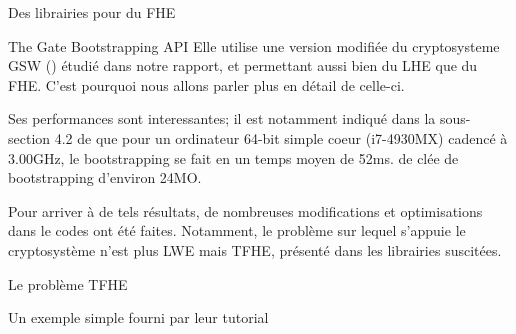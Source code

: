 \begin{section}{Des librairies pour du FHE}
\begin{subsection}{The Gate Bootstrapping API}
Elle utilise une version modifiée du cryptosysteme GSW (\cite{C:GenSahWat13})
étudié dans notre rapport, et permettant aussi bien du LHE que du FHE. C'est
pourquoi nous allons parler plus en détail de celle-ci.

Ses performances sont interessantes; il est notamment indiqué dans la sous-section
4.2 de \cite{cryptoeprint:2016:870} que pour un ordinateur 64-bit simple coeur 
(i7-4930MX) cadencé à 3.00GHz, le bootstrapping se fait en un temps moyen de 52ms.
de clée de bootstrapping d'environ 24MO.

Pour arriver à de tels résultats, de nombreuses modifications et optimisations dans le codes 
ont été faites. Notamment, le problème sur lequel s'appuie le cryptosystème n'est plus 
LWE mais TFHE, présenté dans les librairies suscitées.

\begin{subsubsection}{Le problème TFHE}
\end{subsubsection} %
\begin{subsubsection}{Un exemple simple fourni par leur tutorial}
\end{subsubsection} %
\end{subsection} %
\end{section}
